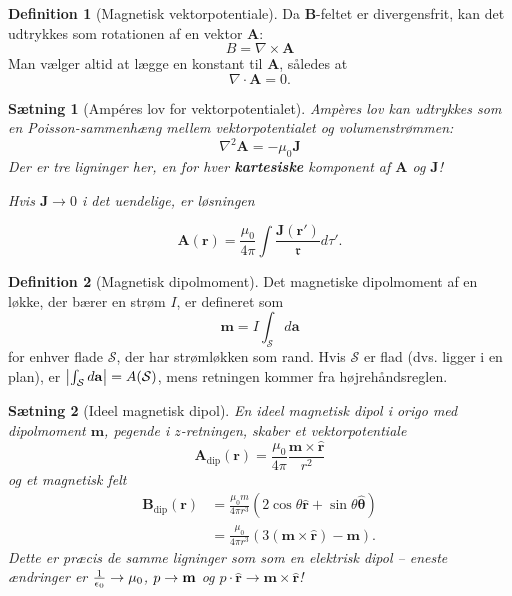 \documentclass[]{article}
\newcommand{\fr}{\mathfrak{r}}
\newcommand{\hr}{\hat{\mathbf{r}}}
\newcommand{\hth}{\hat{\bm{\theta}}}
\newtheorem{theorem}{Sætning}
\theoremstyle{definition}
\newtheorem{definition}{Definition}
\begin{document}
\begin{definition}[Magnetisk vektorpotentiale]
	Da $\mathbf{B}$-feltet er divergensfrit, kan det udtrykkes som rotationen af en vektor $\mathbf{A}$:
	\begin{equation*}
		B = \nabla \times \mathbf{A}
	\end{equation*}
	Man vælger altid at lægge en konstant til $\mathbf{A}$, således at
	\begin{equation*}
		\nabla \cdot \mathbf{A} = 0.
	\end{equation*}
\end{definition}

\begin{theorem}[Ampéres lov for vektorpotentialet]
	Ampères lov kan udtrykkes som en Poisson-sammenhæng mellem vektorpotentialet og volumenstrømmen:
	\begin{equation*}
		\nabla^2 \mathbf{A} = - \mu_0 \mathbf{J}
	\end{equation*}
	Der er tre ligninger her, en for hver \textbf{kartesiske} komponent af $\mathbf{A}$ og $\mathbf{J}$!
	
	Hvis $ \mathbf{J} \rightarrow 0 $ i det uendelige, er løsningen 
	
	\begin{equation*}
		\mathbf{A}(\mathbf{r}) = \frac{\mu_0}{4 \pi } \int \dfrac{\mathbf{J}(\mathbf{r'})}{\fr} d \tau'.
	\end{equation*}
\end{theorem}

\begin{definition}[Magnetisk dipolmoment]
	Det magnetiske dipolmoment af en løkke, der bærer en strøm $I$, er defineret som
	\begin{equation*}
		\mathbf{m} = I \int_\mathcal{S}{d\mathbf{a}}
	\end{equation*}
	for enhver flade $\mathcal{S}$, der har strømløkken som rand. Hvis $\mathcal{S}$ er flad (dvs. ligger i en plan), er $\abs{\int_\mathcal{S}{d\mathbf{a}}} = A(\mathcal{S})$, mens retningen kommer fra højrehåndsreglen.
\end{definition}

\begin{theorem}[Ideel magnetisk dipol]
	En ideel magnetisk dipol i origo med dipolmoment $\mathbf{m}$, pegende i $z$-retningen, skaber et vektorpotentiale
	\begin{equation*}
		\mathbf{A}_\text{dip}(\mathbf{r}) = \frac{\mu_0}{4\pi} \frac{\mathbf{m} \times \hat {\mathbf{r}}}{r^2}
	\end{equation*}
	og et magnetisk felt
	\begin{align*}
		\mathbf{B}_\text{dip}(\mathbf{r}) &= \frac{\mu_0m}{4\pi r^3}(2 \cos \theta \hr + \sin \theta \hth)\\
		&= \frac{\mu_0}{4\pi r^3}(3(\mathbf{m}\times \hr) - \mathbf{m}).
	\end{align*}
	Dette er præcis de samme ligninger som som en elektrisk dipol -- eneste ændringer er $\frac{1}{\epsilon_0} \rightarrow \mu_0$, $p \rightarrow \mathbf{m} $ og $p \cdot \hr \rightarrow \mathbf{m}\times \hr $!
\end{theorem}
\end{document}
